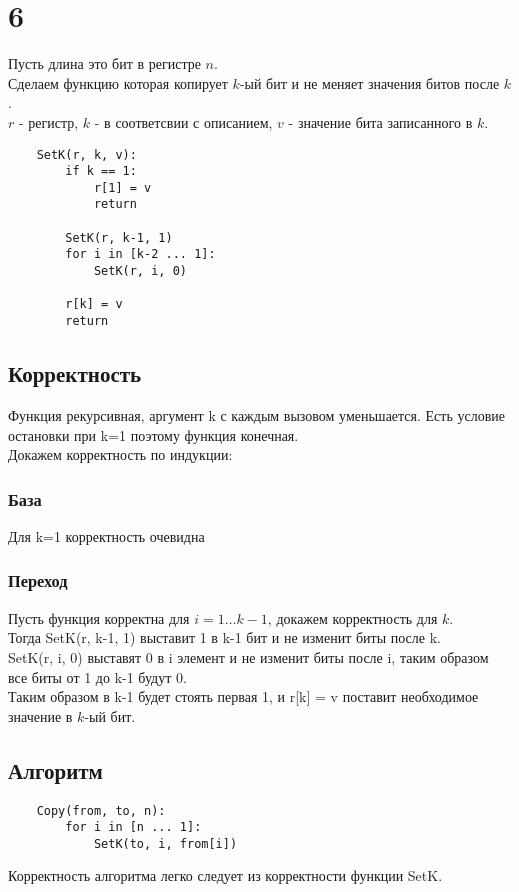 \documentclass[12pt]{exam}
\begin{document}
\section*{6}
Пусть длина это бит в регистре $n$. \\
Сделаем функцию которая копирует $k$-ый бит и не меняет значения битов после $k$. \\
$r$ - регистр, $k$ - в соответсвии с описанием, $v$ - значение бита записанного в $k$.
\begin{lstlisting}
    SetK(r, k, v):
        if k == 1:
            r[1] = v
            return

        SetK(r, k-1, 1)
        for i in [k-2 ... 1]:
            SetK(r, i, 0)
        
        r[k] = v
        return 
\end{lstlisting}

\subsection*{Корректность}
Функция рекурсивная, аргумент k с каждым вызовом уменьшается. 
Есть условие остановки при k=1 поэтому функция конечная. \\
Докажем корректность по индукции:
\subsubsection*{База}
Для k=1 корректность очевидна
\subsubsection*{Переход}
Пусть функция корректна для $i = 1 \ldots k-1$, докажем корректность для $k$. \\
Тогда SetK(r, k-1, 1) выставит 1 в k-1 бит и не изменит биты после k. \\
SetK(r, i, 0) выставят 0 в i элемент и не изменит биты после i, таким образом все биты от 1 до k-1 будут 0.\\
Таким образом в k-1 будет стоять первая 1, и r[k] = v поставит необходимое значение в $k$-ый бит.\\

\subsection*{Алгоритм}
\begin{lstlisting}
    Copy(from, to, n):
        for i in [n ... 1]:
            SetK(to, i, from[i])
\end{lstlisting}
Корректность алгоритма легко следует из корректности функции SetK.
\end{document}
